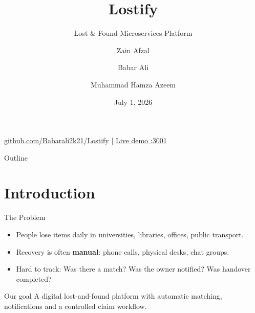 \documentclass[11pt,aspectratio=169]{beamer}
\title{Lostify}
\subtitle{Lost \& Found Microservices Platform}
\author{Zain Afzal \and Babar Ali \and Muhammad Hamza Azeem}
\institute{Team 04 \quad|\quad Serverless Cloud Application Automation\\Prof.\ Sashko Ristov}
\date{July 1, 2026}
\begin{document}
\begin{frame}
  \titlepage
  \vspace{-0.8cm}
  \centering
  \footnotesize
  \href{https://github.com/Babarali2k21/Lostify}{github.com/Babarali2k21/Lostify}
  \quad|\quad
  \href{http://44.220.148.111:3001}{Live demo :3001}
\end{frame}

\begin{frame}{Outline}
  \tableofcontents
\end{frame}

\section{Introduction}

\begin{frame}{The Problem}
  \begin{itemize}
    \item People lose items daily in universities, libraries, offices, public transport.
    \item Recovery is often \textbf{manual}: phone calls, physical desks, chat groups.
    \item Hard to track: Was there a match? Was the owner notified? Was handover completed?
  \end{itemize}
  \vspace{0.6cm}
  \begin{block}{Our goal}
    A digital lost-and-found platform with automatic matching, notifications and a controlled claim workflow.
  \end{block}
\end{frame}
\end{document}

